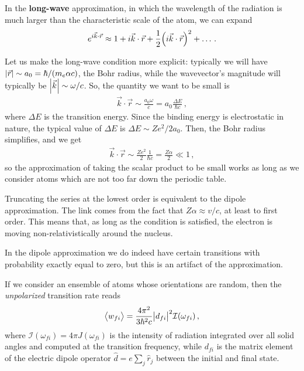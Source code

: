 \documentclass[main.tex]{subfiles}
\begin{document}
In the \textbf{long-wave} approximation, in which the wavelength of the radiation is much larger than the characteristic scale of the atom, we can expand 
%
\begin{align}
e^{i \vec{k} \cdot \vec{r}} \approx 1 + i \vec{k} \cdot \vec{r} + \frac{1}{2} \qty(i \vec{k} \cdot \vec{r})^2 + \dots
\,.
\end{align}

Let us make the long-wave condition more explicit: typically we will have \(\abs{\vec{r}} \sim a_0 = \hbar / (m_e \alpha c)\), the Bohr radius, while the wavevector's magnitude will typically be \(\abs{\vec{k}} \sim \omega / c\). So, the quantity we want to be small is 
%
\begin{align}
\vec{k} \cdot \vec{r} \sim \frac{a_0 \omega }{c} = a_0 \frac{\Delta E}{\hbar c} 
\,,
\end{align}
%
where \(\Delta E\) is the transition energy.
Since the binding energy is electrostatic in nature, the typical value of \(\Delta E\) is \(\Delta E \sim Z e^2 / 2 a_0 \). Then, the Bohr radius simplifies, and we get 
%
\begin{align}
\vec{k} \cdot \vec{r} \sim \frac{Z e^2}{2} \frac{1}{\hbar c} = \frac{Z \alpha }{2} \ll 1
\,,
\end{align}
%
so the approximation of taking the scalar product to be small works as long as we consider atoms which are not too far down the periodic table. 

Truncating the series at the lowest order is equivalent to the dipole approximation. The link comes from the fact that \(Z \alpha \approx v / c\), at least to first order. 
This means that, as long as the condition is satisfied, the electron is moving non-relativistically around the nucleus.  

In the dipole approximation we do indeed have certain transitions with probability exactly equal to zero, but this is an artifact of the approximation. 

If we consider an ensemble of atoms whose orientations are random, then the \emph{unpolarized} transition rate reads 
%
\begin{align}
\expval{w_{fi}} = \frac{4 \pi^2}{3 \hbar^2 c}
\abs{d_{fi}}^2 \mathcal{I}(\omega_{fi})
\,,
\end{align}
%
where \(\mathcal{I}(\omega _{fi}) = 4 \pi J(\omega _{fi})\) is the intensity of radiation integrated over all solid angles and computed at the transition frequency, while \(d_{fi}\) is the matrix element of the electric dipole operator \(\hat{d} = e \sum_j \hat{r}_j\) between the initial and final state. 
\end{document}
